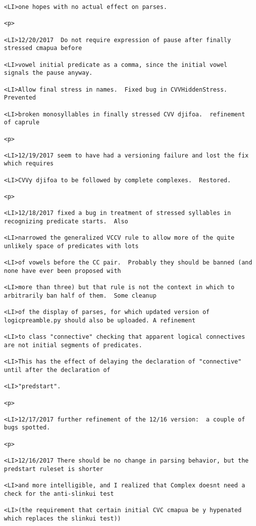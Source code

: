 \documentclass[12pt]{article}
\begin{document}
\begin{lstlisting}
<LI>one hopes with no actual effect on parses.

<p>

<LI>12/20/2017  Do not require expression of pause after finally stressed cmapua before

<LI>vowel initial predicate as a comma, since the initial vowel signals the pause anyway.

<LI>Allow final stress in names.  Fixed bug in CVVHiddenStress.  Prevented

<LI>broken monosyllables in finally stressed CVV djifoa.  refinement of caprule

<p>

<LI>12/19/2017 seem to have had a versioning failure and lost the fix which requires

<LI>CVVy djifoa to be followed by complete complexes.  Restored.

<p>

<LI>12/18/2017 fixed a bug in treatment of stressed syllables in recognizing predicate starts.  Also

<LI>narrowed the generalized VCCV rule to allow more of the quite unlikely space of predicates with lots

<LI>of vowels before the CC pair.  Probably they should be banned (and none have ever been proposed with

<LI>more than three) but that rule is not the context in which to arbitrarily ban half of them.  Some cleanup

<LI>of the display of parses, for which updated version of logicpreamble.py should also be uploaded. A refinement

<LI>to class "connective" checking that apparent logical connectives are not initial segments of predicates.

<LI>This has the effect of delaying the declaration of "connective" until after the declaration of

<LI>"predstart".

<p>

<LI>12/17/2017 further refinement of the 12/16 version:  a couple of bugs spotted.

<p>

<LI>12/16/2017 There should be no change in parsing behavior, but the predstart ruleset is shorter

<LI>and more intelligible, and I realized that Complex doesnt need a check for the anti-slinkui test

<LI>(the requirement that certain initial CVC cmapua be y hypenated which replaces the slinkui test))


\end{lstlisting}
\end{document}
